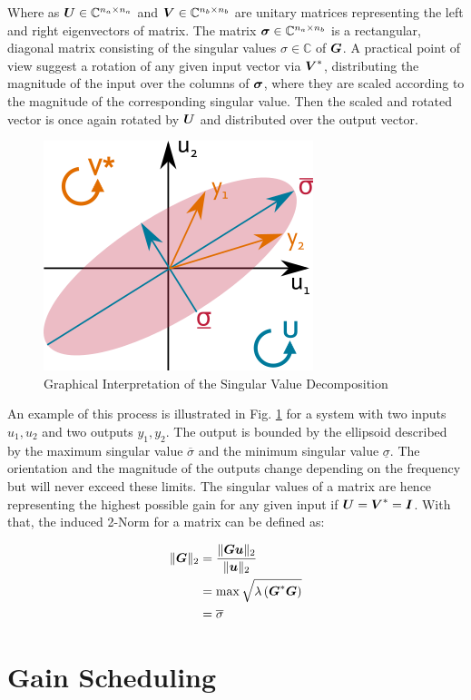 Where as $\mbox{\boldmath$U$} \in \mathbb{C}^{n_a \times n_a}$ and $\mbox{\boldmath$V$} \in \mathbb{C}^{n_b \times n_b} $ are unitary matrices representing the left and right eigenvectors of matrix. The matrix $\mbox{\boldmath$\sigma$} \in \mathbb{C}^{n_a \times n_b}$ is a rectangular, diagonal matrix consisting of the singular values $\sigma \in \mathbb{C}$ of $\mbox{\boldmath$G$}$. A practical point of view suggest a rotation of any given input vector via $\mbox{\boldmath$V$}^*$, distributing the magnitude of the input over the columns of $\mbox{\boldmath$\sigma$}$, where they are scaled according to the magnitude of the corresponding singular value. Then the scaled and rotated vector is once again rotated by $\mbox{\boldmath$U$}$ and distributed over the output vector. \\

\begin{figure}[H]
\begin{minipage}[b]{\textwidth}
\centering
\includegraphics[scale=1]{./Graphics/SVD.png}
\caption{Graphical Interpretation of the Singular Value Decomposition}
\label{c:control:f:SVD}
\end{minipage}
\end{figure}



An example of this process is illustrated in Fig. \ref{c:control:f:SVD} for a system with two inputs $u_1,u_2$ and two outputs $y_1,y_2$. The output is bounded by the ellipsoid described by the maximum singular value $\overline{\sigma}$ and the minimum singular value $\underline{\sigma}$. The orientation and the magnitude of the outputs change depending on the frequency but will never exceed these limits. The singular values of a matrix are hence representing the highest possible gain for any given input if $\mbox{\boldmath$U$} = \mbox{\boldmath$V$}^* = \mbox{\boldmath$I$}$. With that, the induced 2-Norm for a matrix can be defined as:

\begin{align}
\begin{split}
\lVert \mbox{\boldmath$G$} \rVert_2 &= \frac{\lVert \mbox{\boldmath$G$}\mbox{\boldmath$u$}\rVert_2}{\lVert \mbox{\boldmath$u$} \rVert_2} \\
&= \max \sqrt{\lambda\left( \mbox{\boldmath$G$}^* \mbox{\boldmath$G$}\right)} \\
&= \overline{\sigma}
\end{split}
\label{c:control:e:MaxSingularValue}
\end{align}

\section{Gain Scheduling} %
\label{c:control:s:gainsched}

